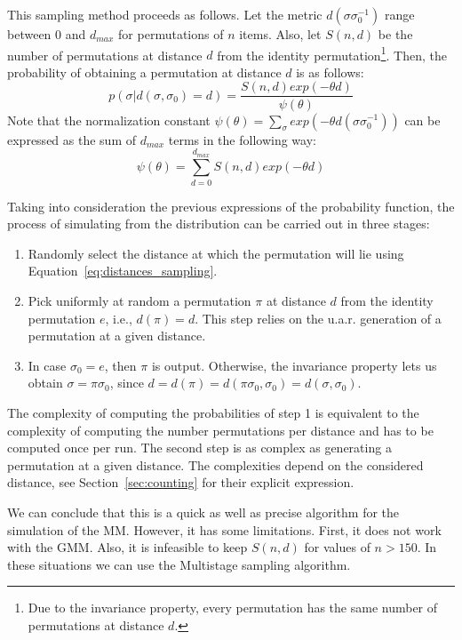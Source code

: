 \documentclass[article,nojss]{jss}
\begin{document}
This sampling method proceeds as follows. Let the metric $d(\sigma \sigma_0^{-1})$ range between  $0$ and $d_{max}$ for permutations of $n$ items. Also, let $S(n,d)$ be the number of permutations at distance $d$ from the identity permutation\footnote{Due to the invariance property, every permutation has the same number of permutations at distance $d$.}. Then, the probability of obtaining a permutation at distance $d$ is as follows:
\begin{equation}
p(\sigma | d(\sigma, \sigma_0)=d) = \frac{S(n,d) exp(-\theta d) }{\psi(\theta)}
\label{eq:distances_sampling}
\end{equation}
Note that the normalization constant $\psi(\theta)=\sum _{ \sigma}  exp({-\theta d(\sigma \sigma_0^{-1})})$ can be expressed as the sum of $d_{max}$ terms in the following way:
\begin{equation}
\psi(\theta) = \sum _{d=0}^{d_{max}} S(n,d) exp(-\theta d)
\nonumber
\end{equation}

Taking into consideration the previous expressions of the probability function, the process of simulating from the distribution can be carried out in three stages: 
\begin{enumerate}
	\item Randomly select the distance at which the permutation will lie using Equation~\eqref{eq:distances_sampling}. 
	\item Pick uniformly at random a  permutation $\pi$ at distance $d$ from the identity permutation $e$, i.e., $d(\pi)=d$. This step relies on the u.a.r. generation of a permutation at a given distance. 
	\item In case $\sigma_0= e$, then $\pi$ is output. Otherwise, the invariance property lets us obtain $\sigma = \pi \sigma_0$, since $d=d(\pi)=d(\pi \sigma_0, \sigma_0)=d(\sigma, \sigma_0)$.
\end{enumerate}

The complexity of computing the probabilities of step 1 is equivalent to the complexity of computing the number permutations per distance and has to be computed once per run. The second step is as complex as generating a permutation at a given distance. The complexities depend on the considered distance, see Section~\ref{sec:counting} for their explicit expression. 

We can conclude that this is a quick as well as precise algorithm for the simulation of the MM. However, it has some limitations. First, it does not work with the GMM. Also, it is infeasible to keep $S(n,d)$ for values of $n>150$. In these situations we can use the Multistage sampling algorithm.
\end{document}
